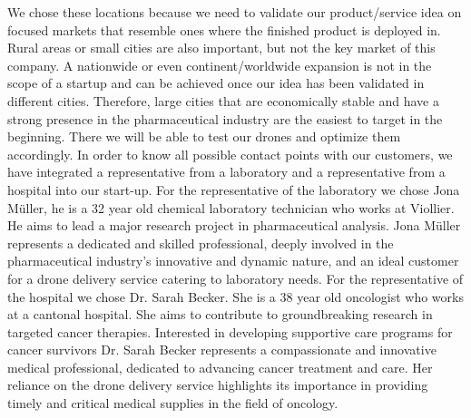 We chose these locations because we need to validate our product/service idea on focused markets that resemble ones where the finished product is deployed in. Rural areas or small cities are also important, but not the key market of this company. A nationwide or even continent/worldwide expansion is not in the scope of a startup and can be achieved once our idea has been validated in different cities. Therefore, large cities that are economically stable and have a strong presence in the pharmaceutical industry are the easiest to target in the beginning. There we will be able to test our drones and optimize them accordingly.
\newline
\newline
In order to know all possible contact points with our customers, we have integrated a representative from a laboratory and a representative from a hospital into our start-up.
\newline
\newline
For the representative of the laboratory we chose Jona Müller, he is a 32 year old chemical laboratory technician who works at Viollier. He aims to lead a major research project in pharmaceutical analysis. Jona Müller represents a dedicated and skilled professional, deeply involved in the pharmaceutical industry's innovative and dynamic nature, and an ideal customer for a drone delivery service catering to laboratory needs.
\newline
\newline
For the representative of the hospital we chose Dr. Sarah Becker. She is a 38 year old oncologist who works at a cantonal hospital. She aims to contribute to groundbreaking research in targeted cancer therapies. Interested in developing supportive care programs for cancer survivors Dr. Sarah Becker represents a compassionate and innovative medical professional, dedicated to advancing cancer treatment and care. Her reliance on the drone delivery service highlights its importance in providing timely and critical medical supplies in the field of oncology.
